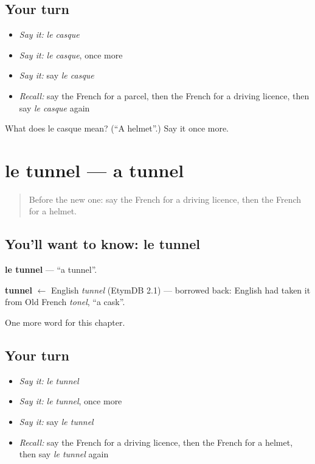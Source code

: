 \subsection*{Your turn}
\begin{itemize}
\raggedright
  \item \emph{Say it:} \emph{le casque}
  \item \emph{Say it:} \emph{le casque}, once more
  \item \emph{Say it:} say \emph{le casque}
  \item \emph{Recall:} say the French for a parcel, then the French for a driving licence, then say \emph{le casque} again
\end{itemize}

\begin{tcolorbox}[breakable,colback=teal!4,colframe=teal!35!black,title={Before you move on}]
What does le casque mean? (\textquotedblleft{}A helmet\textquotedblright{}.) Say it once more.
\end{tcolorbox}
\section[le tunnel]{le tunnel — a tunnel}

\label{lesson:FR-C253-tunnel}



\begin{quote}
Before the new one: say the French for a driving licence, then the French for a helmet.
\end{quote}

\subsection*{You'll want to know: le tunnel}
\textbf{le tunnel} — \textquotedblleft{}a tunnel\textquotedblright{}.

\begin{cousinweb}
\textbf{tunnel} $\leftarrow$ English \emph{tunnel} (EtymDB 2.1) — borrowed back: English had taken it from Old French \emph{tonel}, \textquotedblleft{}a cask\textquotedblright{}.
\end{cousinweb}

\begin{grammarlens}[title={What you've built}]
One more word for this chapter.
\end{grammarlens}

\subsection*{Your turn}
\begin{itemize}
\raggedright
  \item \emph{Say it:} \emph{le tunnel}
  \item \emph{Say it:} \emph{le tunnel}, once more
  \item \emph{Say it:} say \emph{le tunnel}
  \item \emph{Recall:} say the French for a driving licence, then the French for a helmet, then say \emph{le tunnel} again
\end{itemize}

